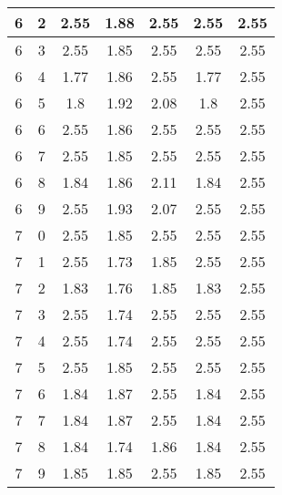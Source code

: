 \begin{longtable}{|c|c||c||c|c||c|c|}
	6 & 2 & 2.55 & 1.88 & 2.55 & 2.55 & 2.55 \\ \hline
	6 & 3 & 2.55 & 1.85 & 2.55 & 2.55 & 2.55 \\ \hline
	6 & 4 & 1.77 & 1.86 & 2.55 & 1.77 & 2.55 \\ \hline
	6 & 5 & 1.8 & 1.92 & 2.08 & 1.8 & 2.55 \\ \hline
	6 & 6 & 2.55 & 1.86 & 2.55 & 2.55 & 2.55 \\ \hline
	6 & 7 & 2.55 & 1.85 & 2.55 & 2.55 & 2.55 \\ \hline
	6 & 8 & 1.84 & 1.86 & 2.11 & 1.84 & 2.55 \\ \hline
	6 & 9 & 2.55 & 1.93 & 2.07 & 2.55 & 2.55 \\ \hline
	7 & 0 & 2.55 & 1.85 & 2.55 & 2.55 & 2.55 \\ \hline
	7 & 1 & 2.55 & 1.73 & 1.85 & 2.55 & 2.55 \\ \hline
	7 & 2 & 1.83 & 1.76 & 1.85 & 1.83 & 2.55 \\ \hline
	7 & 3 & 2.55 & 1.74 & 2.55 & 2.55 & 2.55 \\ \hline
	7 & 4 & 2.55 & 1.74 & 2.55 & 2.55 & 2.55 \\ \hline
	7 & 5 & 2.55 & 1.85 & 2.55 & 2.55 & 2.55 \\ \hline
	7 & 6 & 1.84 & 1.87 & 2.55 & 1.84 & 2.55 \\ \hline
	7 & 7 & 1.84 & 1.87 & 2.55 & 1.84 & 2.55 \\ \hline
	7 & 8 & 1.84 & 1.74 & 1.86 & 1.84 & 2.55 \\ \hline
	7 & 9 & 1.85 & 1.85 & 2.55 & 1.85 & 2.55 \\ \hline
\end{longtable}
\clearpage{}

